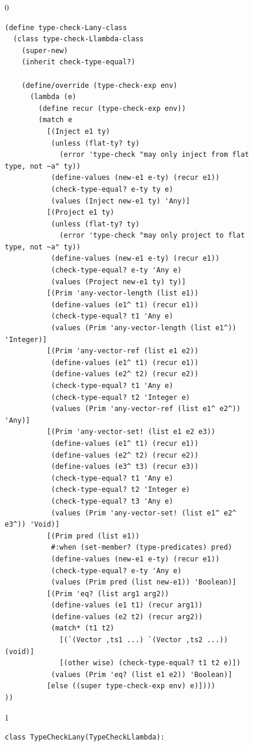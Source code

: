 \documentclass[7x10]{TimesAPriori_MIT}%
\def\racketEd{0}
\def\pythonEd{1}
\def\edition{1}
\newcommand{\pythonColor}[0]{}
\numberwithin{theorem}{chapter}
\numberwithin{definition}{chapter}
\numberwithin{equation}{chapter}
\begin{document}
\begin{figure}[btp]
  \begin{tcolorbox}[colback=white]
    {\if\edition\racketEd
\begin{lstlisting}[basicstyle=\ttfamily\footnotesize]
(define type-check-Lany-class
  (class type-check-Llambda-class
    (super-new)
    (inherit check-type-equal?)

    (define/override (type-check-exp env)
      (lambda (e)
        (define recur (type-check-exp env))
        (match e
          [(Inject e1 ty)
           (unless (flat-ty? ty)
             (error 'type-check "may only inject from flat type, not ~a" ty))
           (define-values (new-e1 e-ty) (recur e1))
           (check-type-equal? e-ty ty e)
           (values (Inject new-e1 ty) 'Any)]
          [(Project e1 ty)
           (unless (flat-ty? ty)
             (error 'type-check "may only project to flat type, not ~a" ty))
           (define-values (new-e1 e-ty) (recur e1))
           (check-type-equal? e-ty 'Any e)
           (values (Project new-e1 ty) ty)]
          [(Prim 'any-vector-length (list e1))
           (define-values (e1^ t1) (recur e1))
           (check-type-equal? t1 'Any e)
           (values (Prim 'any-vector-length (list e1^)) 'Integer)]
          [(Prim 'any-vector-ref (list e1 e2))
           (define-values (e1^ t1) (recur e1))
           (define-values (e2^ t2) (recur e2))
           (check-type-equal? t1 'Any e)
           (check-type-equal? t2 'Integer e)
           (values (Prim 'any-vector-ref (list e1^ e2^)) 'Any)]
          [(Prim 'any-vector-set! (list e1 e2 e3))
           (define-values (e1^ t1) (recur e1))
           (define-values (e2^ t2) (recur e2))
           (define-values (e3^ t3) (recur e3))
           (check-type-equal? t1 'Any e)
           (check-type-equal? t2 'Integer e)
           (check-type-equal? t3 'Any e)
           (values (Prim 'any-vector-set! (list e1^ e2^ e3^)) 'Void)]
          [(Prim pred (list e1))
           #:when (set-member? (type-predicates) pred)
           (define-values (new-e1 e-ty) (recur e1))
           (check-type-equal? e-ty 'Any e)
           (values (Prim pred (list new-e1)) 'Boolean)]
          [(Prim 'eq? (list arg1 arg2))
           (define-values (e1 t1) (recur arg1))
           (define-values (e2 t2) (recur arg2))
           (match* (t1 t2)
             [(`(Vector ,ts1 ...) `(Vector ,ts2 ...))   (void)]
             [(other wise) (check-type-equal? t1 t2 e)])
           (values (Prim 'eq? (list e1 e2)) 'Boolean)]
          [else ((super type-check-exp env) e)])))
))
\end{lstlisting}
\fi}
{\if\edition\pythonEd\pythonColor
\begin{lstlisting}
class TypeCheckLany(TypeCheckLlambda):


\end{lstlisting}}
\end{tcolorbox}
\end{figure}
\end{document}
